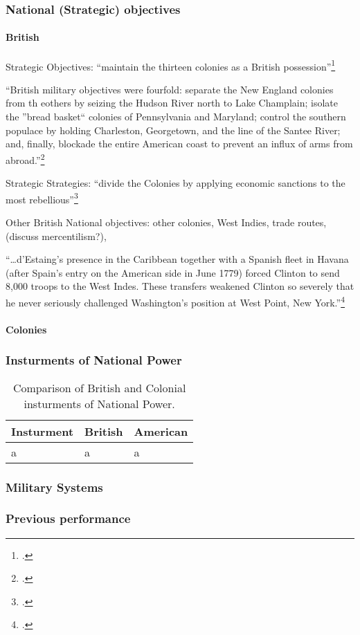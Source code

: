 \subsubsection{National (Strategic) objectives}
\paragraph{British}

Strategic Objectives: ``maintain the thirteen colonies as a British possession''\footcite[2]{moncure_cowpens_1996}

``British military objectives were fourfold: separate the New England colonies from th eothers by seizing the Hudson River north to Lake Champlain; isolate the ''bread basket`` colonies of Pennsylvania and Maryland; control the southern populace by holding Charleston, Georgetown, and the line of the Santee River; and, finally, blockade the entire American coast to prevent an influx of arms from abroad.''\footcite[2]{moncure_cowpens_1996}

Strategic Strategies: ``divide the Colonies by applying economic sanctions to the most rebellious''\footcite[2]{moncure_cowpens_1996}

Other British National objectives: other colonies, West Indies, trade routes, (discuss mercentilism?), 

``\ldots d'Estaing's presence in the Caribbean together with a Spanish fleet in Havana (after Spain's entry on the American side in June 1779) forced Clinton to send 8,000 troops to the West Indes. These transfers weakened Clinton so severely that he never seriously challenged Washington's position at West Point, New York.''\footcite[10]{moncure_cowpens_1996}

\paragraph{Colonies}




\subsubsection{Insturments of National Power}

\begin{table}
  \begin{center}
  \begin{tabular}{lll}\toprule
    Insturment & British & American \\\midrule
	a & a & a \\\bottomrule
  \end{tabular}
  \end{center}
  \caption{Comparison of British and Colonial insturments of National Power.}
\end{table}

\subsubsection{Military Systems}

\subsubsection{Previous performance}

